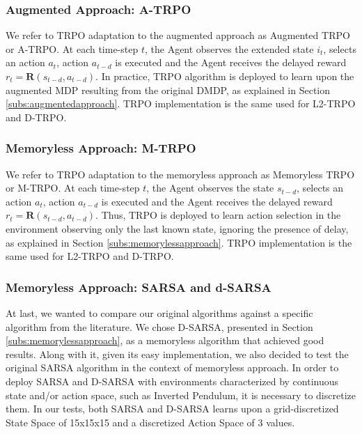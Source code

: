             \subsubsection{Augmented Approach: A-TRPO}
                We refer to TRPO adaptation to the augmented approach as Augmented TRPO or A-TRPO. At each time-step $t$, the Agent observes the extended state $i_t$, selects an action $a_t$, action $a_{t-d}$ is executed and the Agent receives the delayed reward $r_t = \mathbf{R}(s_{t-d}, a_{t-d})$. In practice, TRPO algorithm is deployed to learn upon the augmented MDP resulting from the original DMDP, as explained in Section \ref{subs:augmentedapproach}. TRPO implementation is the same used for L2-TRPO and D-TRPO.
                
            \subsubsection{Memoryless Approach: M-TRPO}
                We refer to TRPO adaptation to the memoryless approach as Memoryless TRPO or M-TRPO. At each time-step $t$, the Agent observes the state $s_{t-d}$, selects an action $a_t$, action $a_{t-d}$ is executed and the Agent receives the delayed reward $r_t = \mathbf{R}(s_{t-d}, a_{t-d})$. Thus, TRPO is deployed to learn action selection in the environment observing only the last known state, ignoring the presence of delay, as explained in Section \ref{subs:memorylessapproach}. TRPO implementation is the same used for L2-TRPO and D-TRPO.
                
                
            \subsubsection{Memoryless Approach: SARSA and d-SARSA}
                At last, we wanted to compare our original algorithms against a specific algorithm from the literature. We chose D-SARSA, presented in Section \ref{subs:memorylessapproach}, as a memoryless algorithm that achieved good results. Along with it, given its easy implementation, we also decided to test the original SARSA algorithm in the context of memoryless approach. \newline
                In order to deploy SARSA and D-SARSA with environments characterized by continuous state and/or action space, such as Inverted Pendulum, it is necessary to discretize them. In our tests, both SARSA and D-SARSA learns upon a grid-discretized State Space of 15x15x15 and a discretized Action Space of 3 values.
                
